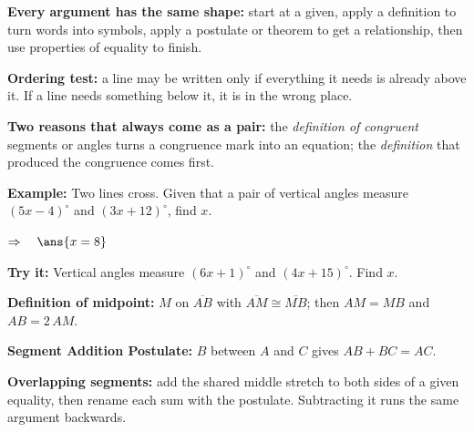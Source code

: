 \documentclass[12pt]{article}
\begin{document}


\begin{formulabox}
\textbf{Every argument has the same shape:} start at a given, apply a definition to turn words into symbols, apply a postulate or theorem to get a relationship, then use properties of equality to finish.\par
\textbf{Ordering test:} a line may be written only if everything it needs is already above it. If a line needs something below it, it is in the wrong place.\par
\textbf{Two reasons that always come as a pair:} the \emph{definition of congruent} segments or angles turns a congruence mark into an equation; the \emph{definition} that produced the congruence comes first.
\end{formulabox}

\begin{examplebox}
\textbf{Example:} \quad Two lines cross. Given that a pair of vertical angles measure $(5x - 4)^\circ$ and $(3x + 12)^\circ$, find $x$.

$\Rightarrow\quad \ans{x = 8}$
\end{examplebox}

\begin{tryitbox}
\textbf{Try it:} \quad Vertical angles measure $(6x + 1)^\circ$ and $(4x + 15)^\circ$. Find $x$.\\[2pt]
\end{tryitbox}


\begin{formulabox}
\textbf{Definition of midpoint:} $M$ on $\overline{AB}$ with $\overline{AM} \cong \overline{MB}$; then $AM = MB$ and $AB = 2\,AM$.\par
\textbf{Segment Addition Postulate:} $B$ between $A$ and $C$ gives $AB + BC = AC$.\par
\textbf{Overlapping segments:} add the shared middle stretch to both sides of a given equality, then rename each sum with the postulate. Subtracting it runs the same argument backwards.
\end{formulabox}
\end{document}

